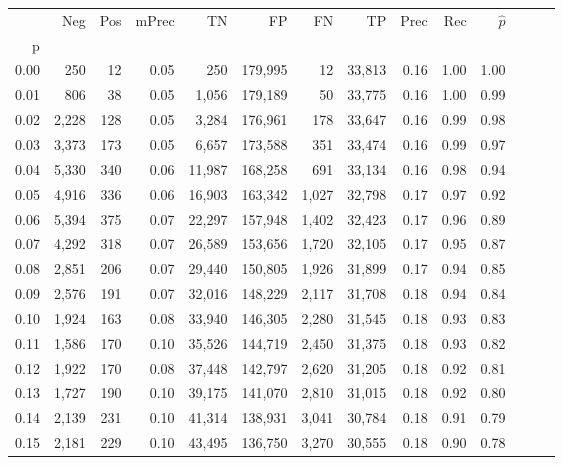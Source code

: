 \begin{tabular}{rrrrrrrrrrrrrr}
\toprule
{} &    Neg &  Pos & mPrec &       TN &       FP &      FN &      TP &  Prec &   Rec & $\hat{p}$ \\
p    &        &      &       &          &          &         &         &       &       &           \\
\midrule
0.00 &    250 &   12 &  0.05 &      250 &  179,995 &      12 &  33,813 &  0.16 &  1.00 &      1.00 \\
0.01 &    806 &   38 &  0.05 &    1,056 &  179,189 &      50 &  33,775 &  0.16 &  1.00 &      0.99 \\
0.02 &  2,228 &  128 &  0.05 &    3,284 &  176,961 &     178 &  33,647 &  0.16 &  0.99 &      0.98 \\
0.03 &  3,373 &  173 &  0.05 &    6,657 &  173,588 &     351 &  33,474 &  0.16 &  0.99 &      0.97 \\
0.04 &  5,330 &  340 &  0.06 &   11,987 &  168,258 &     691 &  33,134 &  0.16 &  0.98 &      0.94 \\
0.05 &  4,916 &  336 &  0.06 &   16,903 &  163,342 &   1,027 &  32,798 &  0.17 &  0.97 &      0.92 \\
0.06 &  5,394 &  375 &  0.07 &   22,297 &  157,948 &   1,402 &  32,423 &  0.17 &  0.96 &      0.89 \\
0.07 &  4,292 &  318 &  0.07 &   26,589 &  153,656 &   1,720 &  32,105 &  0.17 &  0.95 &      0.87 \\
0.08 &  2,851 &  206 &  0.07 &   29,440 &  150,805 &   1,926 &  31,899 &  0.17 &  0.94 &      0.85 \\
0.09 &  2,576 &  191 &  0.07 &   32,016 &  148,229 &   2,117 &  31,708 &  0.18 &  0.94 &      0.84 \\
0.10 &  1,924 &  163 &  0.08 &   33,940 &  146,305 &   2,280 &  31,545 &  0.18 &  0.93 &      0.83 \\
0.11 &  1,586 &  170 &  0.10 &   35,526 &  144,719 &   2,450 &  31,375 &  0.18 &  0.93 &      0.82 \\
0.12 &  1,922 &  170 &  0.08 &   37,448 &  142,797 &   2,620 &  31,205 &  0.18 &  0.92 &      0.81 \\
0.13 &  1,727 &  190 &  0.10 &   39,175 &  141,070 &   2,810 &  31,015 &  0.18 &  0.92 &      0.80 \\
0.14 &  2,139 &  231 &  0.10 &   41,314 &  138,931 &   3,041 &  30,784 &  0.18 &  0.91 &      0.79 \\
0.15 &  2,181 &  229 &  0.10 &   43,495 &  136,750 &   3,270 &  30,555 &  0.18 &  0.90 &      0.78 \\

\end{tabular}
